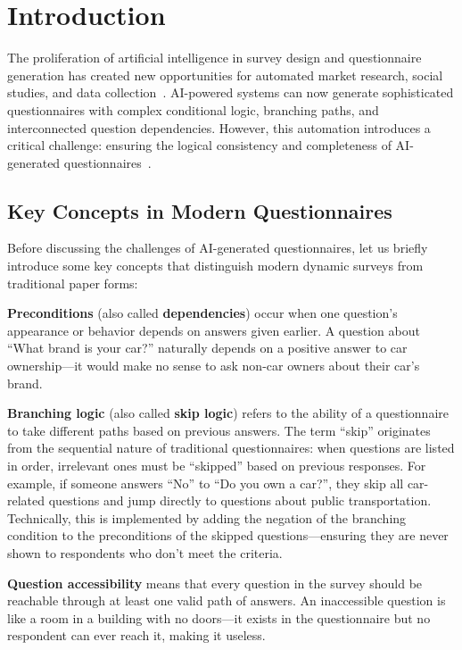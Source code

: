 \chapter{Introduction}
\label{ch:intro}

The proliferation of artificial intelligence in survey design and questionnaire generation has created new opportunities for automated market research, social studies, and data collection~\cite{lerner2024promise,surveymonkey2024ai}. AI-powered systems can now generate sophisticated questionnaires with complex conditional logic, branching paths, and interconnected question dependencies. However, this automation introduces a critical challenge: ensuring the logical consistency and completeness of AI-generated questionnaires~\cite{lerner2024promise,aapor2024llm}.

\section{Key Concepts in Modern Questionnaires}

Before discussing the challenges of AI-generated questionnaires, let us briefly introduce some key concepts that distinguish modern dynamic surveys from traditional paper forms:

\textbf{Preconditions} (also called \textbf{dependencies}) occur when one question's appearance or behavior depends on answers given earlier. A question about ``What brand is your car?'' naturally depends on a positive answer to car ownership—it would make no sense to ask non-car owners about their car's brand.

\textbf{Branching logic} (also called \textbf{skip logic}) refers to the ability of a questionnaire to take different paths based on previous answers. The term ``skip'' originates from the sequential nature of traditional questionnaires: when questions are listed in order, irrelevant ones must be ``skipped'' based on previous responses. For example, if someone answers ``No'' to ``Do you own a car?'', they skip all car-related questions and jump directly to questions about public transportation. Technically, this is implemented by adding the negation of the branching condition to the preconditions of the skipped questions—ensuring they are never shown to respondents who don't meet the criteria.

\textbf{Question accessibility} means that every question in the survey should be reachable through at least one valid path of answers. An inaccessible question is like a room in a building with no doors—it exists in the questionnaire but no respondent can ever reach it, making it useless.

